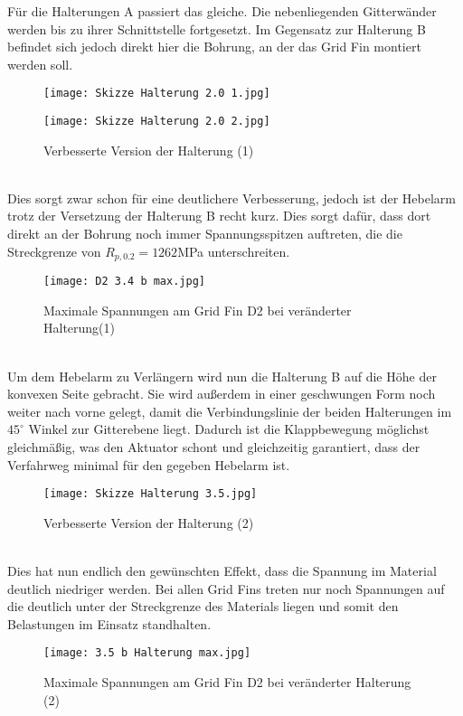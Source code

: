 Für die Halterungen A passiert das gleiche. Die nebenliegenden Gitterwänder werden bis zu ihrer Schnittstelle fortgesetzt. Im Gegensatz zur Halterung B befindet sich jedoch direkt hier die Bohrung, an der das Grid Fin montiert werden soll.
\begin{figure}[h]
	\begin{minipage}[t]{0.45\linewidth}
		\centering
		\texttt{[image: Skizze Halterung 2.0 1.jpg]}
	\end{minipage}
	\hfill
	\begin{minipage}[t]{0.45\linewidth}
		\centering
		\texttt{[image: Skizze Halterung 2.0 2.jpg]}
	\end{minipage}
	\caption{Verbesserte Version der Halterung (1)}
\end{figure}\\
Dies sorgt zwar schon für eine deutlichere Verbesserung, jedoch ist der Hebelarm trotz der Versetzung der Halterung B recht kurz. Dies sorgt dafür, dass dort direkt an der Bohrung noch immer Spannungsspitzen auftreten, die die Streckgrenze von $R_{p, 0.2} = 1262$MPa unterschreiten.
\begin{figure}[h] 
	\centering
	\texttt{[image: D2 3.4 b max.jpg]}
	\caption{Maximale Spannungen am Grid Fin D2 bei veränderter Halterung(1)}
\end{figure}\\
Um dem Hebelarm zu Verlängern wird nun die Halterung B auf die Höhe der konvexen Seite gebracht. Sie wird außerdem in einer geschwungen Form noch weiter nach vorne gelegt, damit die Verbindungslinie der beiden Halterungen im $45^\circ$ Winkel zur Gitterebene liegt. Dadurch ist die Klappbewegung möglichst gleichmäßig, was den Aktuator schont und gleichzeitig garantiert, dass der Verfahrweg minimal für den gegeben Hebelarm ist.
\begin{figure}[h] 
	\centering
	\texttt{[image: Skizze Halterung 3.5.jpg]}
	\caption{Verbesserte Version der Halterung (2)}
\end{figure}\\
Dies hat nun endlich den gewünschten Effekt, dass die Spannung im Material deutlich niedriger werden. Bei allen Grid Fins treten nur noch Spannungen auf die deutlich unter der Streckgrenze des Materials liegen und somit den Belastungen im Einsatz standhalten.
\begin{figure}[h] 
	\centering
	\texttt{[image: 3.5 b Halterung max.jpg]}
	\caption{Maximale Spannungen am Grid Fin D2 bei veränderter Halterung (2)}
\end{figure}\\
